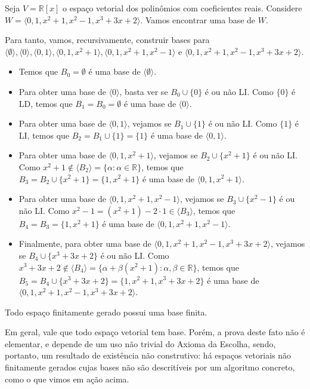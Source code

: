 \begin{example}
Seja $V=\mathbb R[x]$ o espaço vetorial dos polinômios com coeficientes reais.
Considere $W=\langle 0, 1, x^2+1, x^2-1, x^3+3x+2\rangle$.
Vamos encontrar uma base de $W$.

Para tanto, vamos, recursivamente, construir bases para $\langle\emptyset\rangle, \langle 0\rangle, \langle 0, 1\rangle, \langle 0, 1, x^2+1\rangle, \langle 0, 1, x^2+1, x^2-1\rangle$ e $\langle 0, 1, x^2+1, x^2-1, x^3+3x+2\rangle$.


\begin{itemize}
\item Temos que $B_0=\emptyset$ é uma base de $\langle\emptyset\rangle$.
\item Para obter uma base de $\langle 0\rangle$, basta ver se $B_0\cup\{0\}$ é ou não LI.
Como $\{0\}$ é LD, temos que $B_1=B_0=\emptyset$ é uma base de $\langle 0\rangle$.
\item Para obter uma base de $\langle 0, 1\rangle$, vejamos se $B_1\cup\{1\}$ é ou não LI.
Como $\{1\}$ é LI, temos que $B_2=B_1\cup\{1\}=\{1\}$ é uma base de $\langle 0, 1\rangle$.
\item Para obter uma base de $\langle 0, 1, x^2+1\rangle$, vejamos se $B_2\cup\{x^2+1\}$ é ou não LI.
Como $x^2+1 \notin \langle B_2\rangle =\{\alpha: \alpha \in \mathbb R\}$, temos que $B_3=B_2\cup\{x^2+1\}=\{1, x^2+1\}$ é uma base de $\langle 0, 1, x^2+1\rangle$.
\item Para obter uma base de $\langle 0, 1, x^2+1, x^2-1\rangle$, vejamos se $B_3\cup\{x^2-1\}$ é ou não LI.
Como $x^2-1 = (x^2+1) - 2\cdot 1 \in \langle B_3\rangle$, temos que $B_4=B_3=\{1, x^2+1\}$ é uma base de $\langle 0, 1, x^2+1, x^2-1\rangle$.
\item Finalmente, para obter uma base de $\langle 0, 1, x^2+1, x^2-1, x^3+3x+2\rangle$, vejamos se $B_4\cup\{x^3+3x+2\}$ é ou não LI.
Como $x^3+3x+2 \notin \langle B_4\rangle = \{\alpha + \beta (x^2+1) : \alpha, \beta \in \mathbb R\}$, temos que $B_5=B_4\cup\{x^3+3x+2\}=\{1, x^2+1, x^3+3x+2\}$ é uma base de $\langle 0, 1, x^2+1, x^2-1, x^3+3x+2\rangle$.
\end{itemize}
\end{example}
\begin{corollary}
Todo espaço finitamente gerado possui uma base finita.
\end{corollary}
Em geral, vale que todo espaço vetorial tem base.
Porém, a prova deste fato não é elementar, e depende de um uso não trivial do Axioma da Escolha, sendo, portanto, um resultado de existência não construtivo: há espaços vetoriais não finitamente gerados cujas bases não são descritíveis por um algoritmo concreto, como o que vimos em ação acima.

